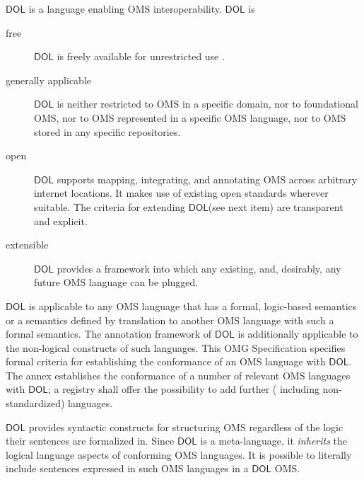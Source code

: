 \documentclass[10pt,fleqn,final]{scrreprt}
\newcommand*{\IS}{OMG Specification\xspace}
\newcommand*{\DOL}{\ensuremath{\mathsf{DOL}}\xspace}
\newenvironment{definitions}[0]{\medskip }{}
\providecommand{\DIFadd}[1]{{\protect\color{blue}\uwave{#1}}} %
\providecommand{\DIFaddbegin}{} %
\providecommand{\DIFaddend}{} %
\begin{document}
\begin{definitions}
\DOL is a language enabling OMS interoperability. 
\DOL is
\begin{description}
\item[free] \DOL is freely available for unrestricted use \DIFaddbegin \DIFadd{(as any OMG specification is)}\DIFaddend .
\item[generally applicable] \DOL is neither restricted to OMS in a specific domain, nor to foundational OMS, nor to OMS represented in a specific OMS language, nor to OMS stored in any specific repositories.
\item[open] \DOL supports mapping, integrating, and annotating OMS across arbitrary internet locations.  It makes use of existing open standards wherever suitable.  The criteria for extending \DOL (see next item) are transparent and explicit.
\item[extensible] \DOL provides a framework into which any existing, and, desirably, any future OMS language can be plugged.
\end{description}
\DOL is applicable to any OMS language that has a formal, logic-based semantics or a semantics defined by translation to another OMS language with such a formal semantics. The annotation framework of \DOL is additionally applicable to the non-logical constructs of such languages. This \IS specifies formal criteria for establishing the conformance of an OMS language with \DOL.  The annex establishes the conformance of a number of relevant OMS languages with \DOL; a registry shall offer the possibility to add further ( including non-standardized) languages. 

\DOL provides syntactic constructs for structuring OMS regardless of the logic their sentences are formalized in. 
Since \DOL is a meta-language,  it \textit{inherits} the logical language aspects of conforming OMS languages.  It is possible to literally include sentences expressed in such OMS languages in a \DOL OMS.



\end{definitions}
\end{document}
